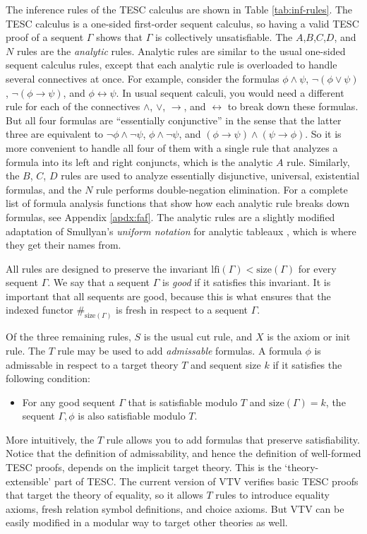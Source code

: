 \documentclass{lipics-v2021}
\newcommand{\idf}[1]{\#_{#1}}
\newcommand{\lfi}[0]{\mathrm{lfi}}
\newcommand{\limp}[0]{\to}
\newcommand{\liff}[0]{\leftrightarrow}
\newcommand{\size}[0]{\mathrm{size}}
\begin{document}
The inference rules of the TESC calculus are shown in Table \ref{tab:inf-rules}.
The TESC calculus is a one-sided first-order sequent calculus, so having 
a valid TESC proof of a sequent $\Gamma$ shows that $\Gamma$ is collectively unsatisfiable.
The $A$,$B$,$C$,$D$, and $N$ rules are the \textit{analytic} rules. 
Analytic rules are similar to the usual one-sided sequent calculus rules, 
except that each analytic rule is overloaded to handle several connectives at once. 
For example, consider the formulas $\phi \land \psi$, $\lnot (\phi \lor \psi)$, 
$\lnot (\phi \limp \psi)$, and $\phi \liff \psi$. In usual sequent calculi, you would 
need a different rule for each of the connectives $\land$, $\lor$, $\limp$, and $\liff$ to 
break down these formulas. But all four formulas are ``essentially conjunctive'' 
in the sense that the latter three are equivalent to $\lnot \phi \land \lnot \psi$, 
$\phi \land \lnot \psi$, and $(\phi \limp \psi) \land (\psi \limp \phi)$.
So it is more convenient to handle all four of them with a single rule that analyzes 
a formula into its left and right conjuncts, which is the analytic $A$ rule.
Similarly, the $B$, $C$, $D$ rules are used to analyze essentially disjunctive, 
universal, existential formulas, and the $N$ rule performs double-negation elimination. 
For a complete list of formula analysis functions that show how each analytic 
rule breaks down formulas, see Appendix \ref{apdx:faf}. The analytic rules are 
a slightly modified adaptation of Smullyan's \textit{uniform notation} for analytic 
tableaux \cite{smullyan1995first}, which is where they get their names from. 

All rules are designed to preserve the invariant $\lfi(\Gamma) < \size(\Gamma)$ 
for every sequent $\Gamma$. We say that a sequent $\Gamma$ is \textit{good} if it satisfies 
this invariant. It is important that all sequents are good, because this is what ensures 
that the indexed functor $\idf{\size(\Gamma)}$ is fresh in respect to a sequent $\Gamma$.

Of the three remaining rules, $S$ is the usual cut rule, and $X$ is the axiom or init rule. 
The $T$ rule may be used to add \textit{admissable} formulas. A formula $\phi$ is admissable 
in respect to a target theory $T$ and sequent size $k$ if it satisfies the following condition:  
\begin{itemize}
  \item For any good sequent $\Gamma$ that is satisfiable modulo $T$ and $\size(\Gamma) = k$, the 
sequent $\Gamma, \phi$ is also satisfiable modulo $T$. 
\end{itemize}
More intuitively, the $T$ rule allows you to add formulas that preserve satisfiability. 
Notice that the definition of admissability, and hence the definition of well-formed 
TESC proofs, depends on the implicit target theory. This is the `theory-extensible' part of TESC. 
The current version of VTV verifies basic TESC proofs that target the theory of equality, so it allows $T$ 
rules to introduce equality axioms, fresh relation symbol definitions, and choice axioms.
But VTV can be easily modified in a modular way to target other theories as well.
\end{document}
